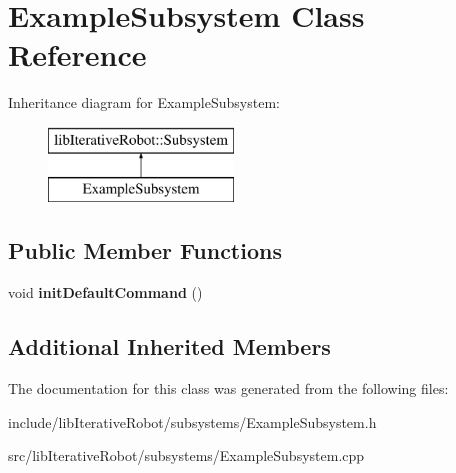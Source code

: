 \hypertarget{class_example_subsystem}{}\section{Example\+Subsystem Class Reference}
\label{class_example_subsystem}
Inheritance diagram for Example\+Subsystem\+:\begin{figure}[H]
\begin{center}
\leavevmode
\includegraphics[height=2.000000cm]{class_example_subsystem}
\end{center}
\end{figure}
\subsection*{Public Member Functions}
\begin{DoxyCompactItemize}
\item 
\mbox{\label{class_example_subsystem_a147ea127ab9c71f9d86e4f5e5a4e9d5a}} 
void {\bfseries init\+Default\+Command} ()
\end{DoxyCompactItemize}
\subsection*{Additional Inherited Members}


The documentation for this class was generated from the following files\+:\begin{DoxyCompactItemize}
\item 
include/lib\+Iterative\+Robot/subsystems/Example\+Subsystem.\+h\item 
src/lib\+Iterative\+Robot/subsystems/Example\+Subsystem.\+cpp\end{DoxyCompactItemize}
